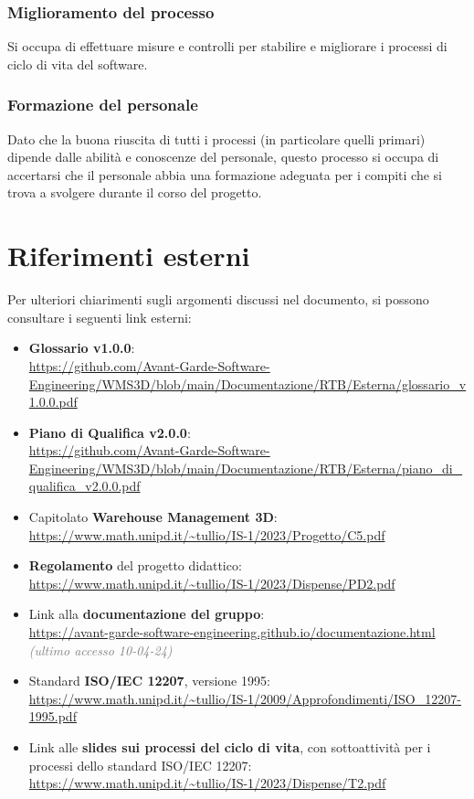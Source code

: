 \subsubsection{Miglioramento del processo}
Si occupa di effettuare misure e controlli per stabilire e migliorare i processi di ciclo di vita del software.
\subsubsection{Formazione del personale}
Dato che la buona riuscita di tutti i processi (in particolare quelli primari) dipende dalle abilità e conoscenze del personale, questo processo si occupa di accertarsi che il personale abbia una formazione adeguata per i compiti che si trova a svolgere durante il corso del progetto.

\newpage
\newpage
\section{Riferimenti esterni}\label{sec:riferimenti_esterni}
Per ulteriori chiarimenti sugli argomenti discussi nel documento, si possono consultare i seguenti link esterni:
\begin{itemize}
    \item \textbf{Glossario v1.0.0}:\\
    \url{https://github.com/Avant-Garde-Software-Engineering/WMS3D/blob/main/Documentazione/RTB/Esterna/glossario_v1.0.0.pdf}
    \item \textbf{Piano di Qualifica v2.0.0}:\\
    \url{https://github.com/Avant-Garde-Software-Engineering/WMS3D/blob/main/Documentazione/RTB/Esterna/piano_di_qualifica_v2.0.0.pdf}
    \item Capitolato \textbf{Warehouse Management 3D}:\\
    \url{https://www.math.unipd.it/~tullio/IS-1/2023/Progetto/C5.pdf} 
    \item \textbf{Regolamento} del progetto didattico:\\
    \url{https://www.math.unipd.it/~tullio/IS-1/2023/Dispense/PD2.pdf} 
    \item Link alla \textbf{documentazione del gruppo}:\\
    \url{https://avant-garde-software-engineering.github.io/documentazione.html} \textcolor{gray}{\textit{(ultimo accesso 10-04-24)}}
    \item Standard \textbf{ISO/IEC 12207}, versione 1995:\\
    \url{https://www.math.unipd.it/~tullio/IS-1/2009/Approfondimenti/ISO_12207-1995.pdf} 
    \item Link alle \textbf{slides sui processi del ciclo di vita}, con sottoattività per i processi dello standard ISO/IEC 12207:\\
    \url{https://www.math.unipd.it/~tullio/IS-1/2023/Dispense/T2.pdf} 
\end{itemize}
